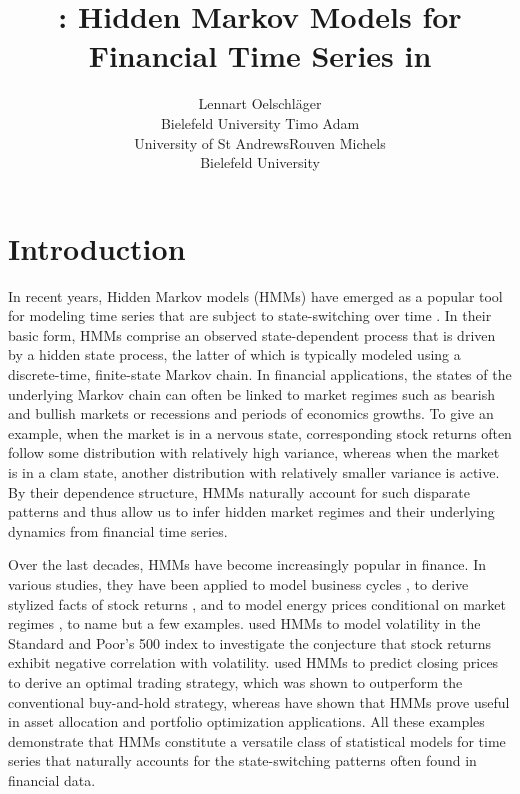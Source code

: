 \documentclass[article]{jss}
\author{Lennart Oelschl\"ager \\Bielefeld University \And Timo Adam \\University of St Andrews\And Rouven Michels \\Bielefeld University}
\title{\pkg{fHMM}: Hidden Markov Models for Financial Time Series in \proglang{R}}
\newcommand{\fct}[1]{\code{#1()}}
\begin{document}



\section{Introduction}
\label{sec:intro} %

In recent years, Hidden Markov models (HMMs) have emerged as a popular tool for modeling time series that are subject to state-switching over time \citep{zuc16}. In their basic form, HMMs comprise an observed state-dependent process that is driven by a hidden state process, the latter of which is typically modeled using a discrete-time, finite-state Markov chain. In financial applications, the states of the underlying Markov chain can often be linked to market regimes such as bearish and bullish markets or recessions and periods of economics growths. To give an example, when the market is in a nervous state, corresponding stock returns often follow some distribution with relatively high variance, whereas when the market is in a clam state, another distribution with relatively smaller variance is active. By their dependence structure, HMMs naturally account for such disparate patterns and thus allow us to infer hidden market regimes and their underlying dynamics from financial time series.

Over the last decades, HMMs have become increasingly popular in finance. In various studies, they have been applied to model business cycles \citep{kim98, gre00}, to derive stylized facts of stock returns \citep{bul06, nys15a}, and to model energy prices conditional on market regimes \citep{lan18, ada19c, ada22}, to name but a few examples. \cite{lih17} used HMMs to model volatility in the Standard and Poor's 500 index to investigate the conjecture that stock returns exhibit negative correlation with volatility. \cite{ngu18} used HMMs to predict closing prices to derive an optimal trading strategy, which was shown to outperform the conventional buy-and-hold strategy, whereas \cite{bul11, nys15a, nys18} have shown that HMMs prove useful in asset allocation and portfolio optimization applications. All these examples demonstrate that HMMs constitute a versatile class of statistical models for time series that naturally accounts for the state-switching patterns often found in financial data.
\end{document}
